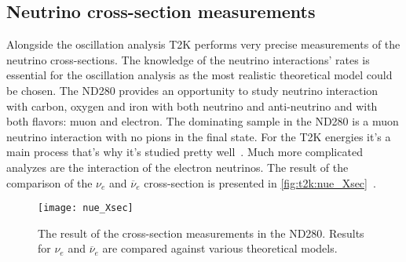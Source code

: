 \documentclass[../main.tex]{subfiles}
\begin{document}
\subsection{Neutrino cross-section measurements}
Alongside the oscillation analysis T2K performs very precise measurements of the neutrino cross-sections. The knowledge of the neutrino interactions' rates is essential for the oscillation analysis as the most realistic theoretical model could be chosen. The ND280 provides an opportunity to study neutrino interaction with carbon, oxygen and iron with both neutrino and anti-neutrino and with both flavors: muon and electron. The dominating sample in the ND280 is a muon neutrino interaction with no pions in the final state. For the T2K energies it's a main process that's why it's studied pretty well~\cite{Abe2020a}. Much more complicated analyzes are the interaction of the electron neutrinos. The result of the comparison of the $\nu_e$ and $\overline{\nu}_e$ cross-section is presented in \autoref{fig:t2k:nue_Xsec}~\cite{Abe2020}.

\begin{figure}[!ht]
  \centering
  \texttt{[image: nue\_Xsec]}
  \caption{The result of the cross-section measurements in the ND280. Results for $\nu_e$ and $\overline{\nu}_e$ are compared against various theoretical models.}
  \label{fig:t2k:nue_Xsec}
\end{figure}
\end{document}
